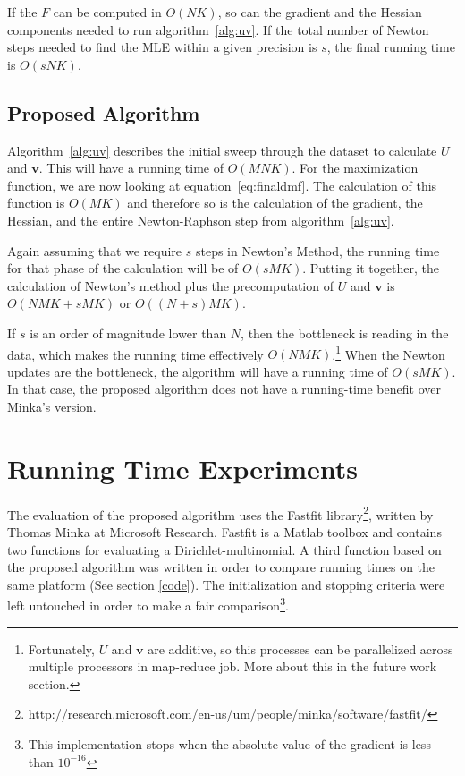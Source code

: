 \documentclass[twoside]{article}
\begin{document}
If the $F$ can be computed in $O(NK)$, so can the gradient and the Hessian components needed to run algorithm~\ref{alg:uv}. If the total number of Newton steps needed to find the MLE within a given precision is $s$, the final running time is $O(sNK)$.
\subsection{Proposed Algorithm}

Algorithm~\ref{alg:uv} describes the initial sweep through the dataset to calculate $U$ and $\mathbf{v}$.  This will have a running time of $O(MNK)$.
For the maximization function, we are now looking at equation~\ref{eq:finaldmf}.  The calculation of this function is $O(MK)$ and therefore so is the calculation of the gradient, the Hessian, and the entire Newton-Raphson step from algorithm~\ref{alg:uv}.

Again assuming that we require $s$ steps in Newton's Method, the running time for that phase of the calculation will be of $O(sMK)$.
Putting it together, the calculation of Newton's method plus the precomputation of $U$ and $\mathbf{v}$ is $O(NMK + sMK)$ or $O((N+s)MK)$.

If $s$ is an order of magnitude lower than $N$, then the bottleneck is reading in the data, which makes the running time effectively $O(NMK)$.\footnote{Fortunately, $U$ and $\mathbf{v}$ are additive, so this processes can be parallelized across multiple processors in map-reduce job. More about this in the future work section.} When the Newton updates are the bottleneck, the algorithm will have a running time of $O(sMK)$.  In that case, the proposed algorithm does not have a running-time benefit over Minka's version.

\section{Running Time Experiments}
The evaluation of the proposed algorithm uses the Fastfit library\footnote{http://research.microsoft.com/en-us/um/people/minka/software/fastfit/}, written by Thomas Minka at Microsoft Research\cite{minka}.  Fastfit is a Matlab toolbox and contains two functions for evaluating a Dirichlet-multinomial. A third function based on the proposed algorithm was written in order to compare running times on the same platform (See section \ref{code}).  The initialization and stopping criteria were left untouched in order to make a fair comparison\footnote{This implementation stops when the absolute value of the gradient is less than $10^{-16}$}.
\end{document}
